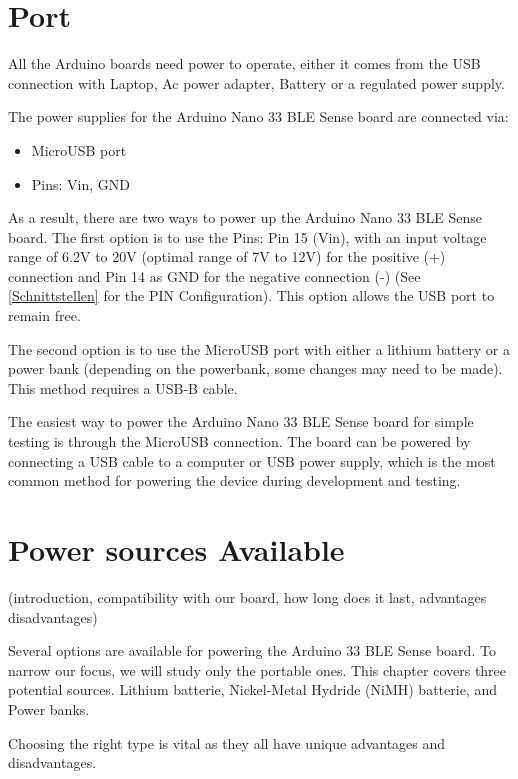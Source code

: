 \section{Port}

All the Arduino boards need power to operate, either it comes from the USB connection with Laptop, Ac power adapter, Battery or a regulated power supply. 

The power supplies for the Arduino Nano 33 BLE Sense board are connected via:

\begin{itemize}
    \item MicroUSB port
    \item Pins: Vin, GND
\end{itemize}

As a result, there are two ways to power up the Arduino Nano 33 BLE Sense board. The first option is to use the Pins: Pin 15 (Vin), with an input voltage range of 6.2V to 20V (optimal range of 7V to 12V) for the positive (+) connection and Pin 14 as GND for the negative connection (-) (See \ref{Schnittstellen} for the PIN Configuration). This option allows the USB port to remain free.


The second option is to use the MicroUSB port with either a lithium battery or a power bank (depending on the powerbank, some changes may need to be made). This method requires a USB-B cable. 


The easiest way to power the Arduino Nano 33 BLE Sense board for simple testing is through the MicroUSB connection. The board can be powered by connecting a USB cable to a computer or USB power supply, which is the most common method for powering the device during development and testing.

\section{Power sources Available}

(introduction, compatibility with our board, how long does it last, advantages disadvantages)

Several options are available for powering the Arduino 33 BLE Sense board. To narrow our focus, we will study only the portable ones. This chapter covers three potential sources.
Lithium batterie, Nickel-Metal Hydride (NiMH) batterie, and Power banks.

Choosing the right type is vital as they all have unique advantages and disadvantages.


%
%


